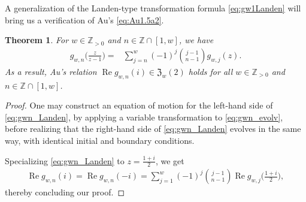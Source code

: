 \documentclass[final,notitlepage,12pt,reqno]{amsart}
\DeclareMathOperator{\R}{Re}
\theoremstyle{plain}
\newtheorem{theorem}{Theorem}[section]
\theoremstyle{definition}
\numberwithin{equation}{section}
\begin{document}
A generalization of the Landen-type transformation formula \eqref{eq:gw1Landen} will bring us a verification of Au's \eqref{eq:Au1.5a2}.\begin{theorem}For $ w\in\mathbb Z_{>0}$ and $ n\in\mathbb Z\cap[1,w]$, we have
\begin{align}
g_{w,n}\bigg(\frac z{z-1}\bigg)={}&\sum_{j=n}^w(-1)^j\binom{j-1}{n-1}g_{w,j}(z).\label{eq:gwn_Landen}
\end{align} As a result, Au's relation $\R g_{w,n}(i)\in\mathfrak Z_w(2)$ holds for all $ w\in\mathbb Z_{>0}$ and $ n\in\mathbb Z\cap[1,w]$.
\end{theorem}\begin{proof}One may construct an equation of motion  for the left-hand side of \eqref{eq:gwn_Landen}, by applying a  variable transformation to  \eqref{eq:gwn_evolv}, before realizing that the right-hand side of \eqref{eq:gwn_Landen} evolves in the same way, with identical initial and boundary conditions.    

 Specializing  \eqref{eq:gwn_Landen} to $ z=\frac{1+i}{2}$, we get\begin{align}
\R g_{w,n}(i)=\R g_{w,n}(-i)=\sum_{j=1}^w(-1)^j\binom{j-1}{n-1}\R g_{w,j}\bigg(\frac{1+i}2\bigg),
\end{align}thereby concluding our proof. 
\end{proof}
\end{document}
